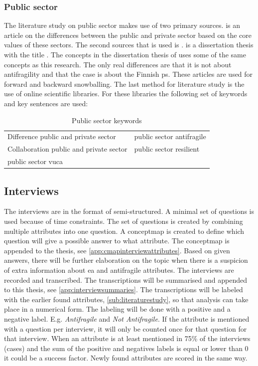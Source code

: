 \subsubsection{Public sector}
\label{subsub:publicsector}
The literature study on public sector makes use of two primary sources. \textcite{Wal2008} is an article on the differences between the public and private sector based on the core values of these sectors. The second sources that is used is \textcite{Nurmi2021}. \textcite{Nurmi2021} is a dissertation thesis with the title . The concepts in the dissertation thesis of \citeauthor{Nurmi2021} uses some of the same concepts as this research. The only real differences are that it is not about \gls{antifragility} and that the case is about the Finnish \gls{ps}. These articles are used for forward and backward snowballing. The last method for literature study is the use of online scientific libraries. For these libraries the following set of keywords and key sentences are used:
\begin{table}[H]
	\centering
	\begin{tabular}{p{}p{}}
		\toprule
		Difference public and private sector &	public sector \gls{antifragile}\\%
		Collaboration public and private sector & public sector \gls{resilient}\\%
		public sector \acrshort{vuca} & \\%
		\bottomrule
	\end{tabular}
	\caption{Public sector keywords}
	\label{tab:publicsectorkeywords}
\end{table}
\subsection{Interviews}
\label{sub:interviews}
The interviews are in the format of semi-structured. A minimal set of questions is used because of time constraints. The set of questions is created by combining multiple attributes into one question. A \gls{conceptmap} is created to define which question will give a possible answer to what attribute. The \gls{conceptmap} is appended to the thesis, see \cref{app:cmapinterviewattributes}. Based on given answers, there will be further elaboration on the topic when there is a suspicion of extra information about \acrshort{ea} and \gls{antifragile} attributes. The interviews are recorded and transcribed. The transcriptions will be summarised and appended to this thesis, see \cref{app:interviewsummaries}. The transcriptions will be labeled with the earlier found attributes, \cref{sub:literaturestudy}, so that analysis can take place in a numerical form. The labeling will be done with a positive and a negative label. E.g. \textit{Antifragile} and \textit{Not Antifragile}. If the attribute is mentioned with a question per interview, it will only be counted once for that question for that interview. When an attribute is at least mentioned in 75\% of the interviews (cases) and the sum of the positive and negatives labels is equal or lower than 0 it could be a success factor. Newly found attributes are scored in the same way.
